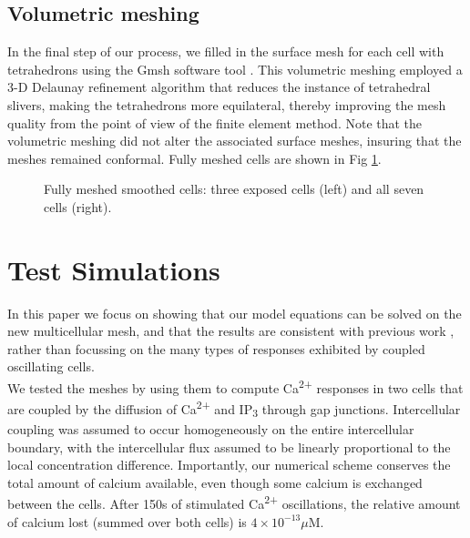 \documentclass[10pt,letterpaper]{article}
\begin{document}
\subsection*{Volumetric meshing}

In the final step of our process, we filled in the surface mesh for each cell with tetrahedrons using the Gmsh software tool \cite{NME:NME2579}. This volumetric meshing employed a 3-D Delaunay refinement algorithm that reduces the instance of tetrahedral slivers, making the tetrahedrons more equilateral, thereby improving the mesh quality from the point of view of the finite element method. Note that the volumetric meshing did not alter the associated surface meshes, insuring that the meshes remained conformal. Fully meshed cells are shown in Fig \ref{fig:smooth}.\\

\begin{figure}[h!]
\caption{Fully meshed smoothed cells: three exposed cells (left) and all seven cells (right).}
\label{fig:smooth}
\end{figure}

\section*{Test Simulations}
In this paper we focus on showing that our model equations can be solved on the new multicellular mesh, and that the results are consistent with previous work \cite{Sneyd2017383}, rather than focussing on the many types of responses exhibited by coupled oscillating cells.\\

We tested the meshes by using them to compute Ca\textsuperscript{2+} responses in two cells that are coupled by the diffusion of Ca\textsuperscript{2+} and IP\textsubscript{3} through gap junctions. Intercellular coupling was assumed to occur homogeneously on the entire intercellular boundary, with the intercellular flux assumed to be linearly proportional to the local concentration difference.
Importantly, our numerical scheme  conserves the total amount of calcium available, even though some calcium is exchanged between the cells. After 150s of stimulated Ca\textsuperscript{2+} oscillations, the relative amount of calcium lost (summed over both cells) is $4\times10^{-13} \mu\mathrm{M}$.\\
\end{document}

